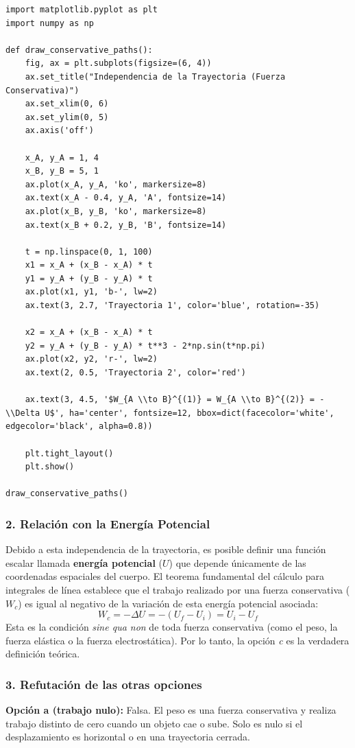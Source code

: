 \documentclass[12pt, a4paper]{article}
\begin{document}
\begin{lstlisting}
import matplotlib.pyplot as plt
import numpy as np

def draw_conservative_paths():
    fig, ax = plt.subplots(figsize=(6, 4))
    ax.set_title("Independencia de la Trayectoria (Fuerza Conservativa)")
    ax.set_xlim(0, 6)
    ax.set_ylim(0, 5)
    ax.axis('off')

    x_A, y_A = 1, 4
    x_B, y_B = 5, 1
    ax.plot(x_A, y_A, 'ko', markersize=8)
    ax.text(x_A - 0.4, y_A, 'A', fontsize=14)
    ax.plot(x_B, y_B, 'ko', markersize=8)
    ax.text(x_B + 0.2, y_B, 'B', fontsize=14)

    t = np.linspace(0, 1, 100)
    x1 = x_A + (x_B - x_A) * t
    y1 = y_A + (y_B - y_A) * t
    ax.plot(x1, y1, 'b-', lw=2)
    ax.text(3, 2.7, 'Trayectoria 1', color='blue', rotation=-35)

    x2 = x_A + (x_B - x_A) * t
    y2 = y_A + (y_B - y_A) * t**3 - 2*np.sin(t*np.pi)
    ax.plot(x2, y2, 'r-', lw=2)
    ax.text(2, 0.5, 'Trayectoria 2', color='red')

    ax.text(3, 4.5, '$W_{A \\to B}^{(1)} = W_{A \\to B}^{(2)} = -\\Delta U$', ha='center', fontsize=12, bbox=dict(facecolor='white', edgecolor='black', alpha=0.8))

    plt.tight_layout()
    plt.show()

draw_conservative_paths()
\end{lstlisting}

\subsubsection*{2. Relación con la Energía Potencial}
Debido a esta independencia de la trayectoria, es posible definir una función escalar llamada \textbf{energía potencial} ($U$) que depende únicamente de las coordenadas espaciales del cuerpo. 
El teorema fundamental del cálculo para integrales de línea establece que el trabajo realizado por una fuerza conservativa ($W_c$) es igual al negativo de la variación de esta energía potencial asociada:
$$W_c = -\Delta U = -(U_f - U_i) = U_i - U_f$$
Esta es la condición \textit{sine qua non} de toda fuerza conservativa (como el peso, la fuerza elástica o la fuerza electrostática). Por lo tanto, la opción \textit{c} es la verdadera definición teórica.

\subsubsection*{3. Refutación de las otras opciones}
\textbf{Opción a (trabajo nulo):} Falsa. El peso es una fuerza conservativa y realiza trabajo distinto de cero cuando un objeto cae o sube. Solo es nulo si el desplazamiento es horizontal o en una trayectoria cerrada.
\end{document}
